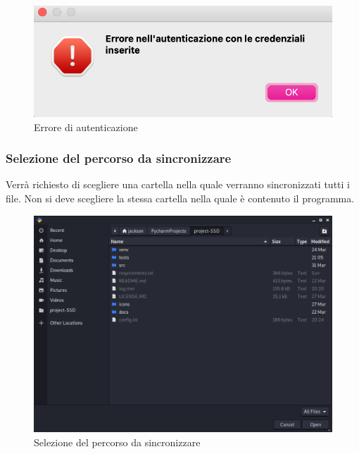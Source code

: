 \begin{figure}[H]
    \centering
    \includegraphics[scale = 0.50]{components/img/err-login.png}
    \caption{Errore di autenticazione}
    \label{fig:errore login}
\end{figure}


\subsubsection{Selezione del percorso da sincronizzare}
\label{sec:selezionepath}
Verrà richiesto di scegliere una cartella nella quale verranno sincronizzati tutti i file. Non si deve scegliere la stessa cartella nella quale è contenuto il programma.
\begin{figure}[H]
    \centering
    \includegraphics[scale = 0.30]{components/img/selezione-path.png}
    \caption{Selezione del percorso da sincronizzare}
    \label{fig:Selezione del percorso da sincronizzare}
\end{figure}


